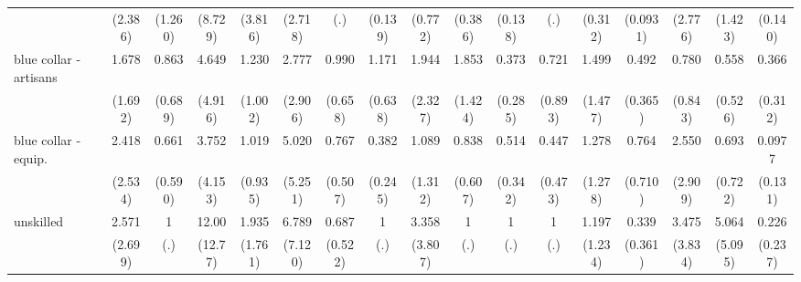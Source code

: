 {\begin{tabular}{l*{16}{c}}
                    &     (2.386)         &     (1.260)         &     (8.729)         &     (3.816)         &     (2.718)         &         (.)         &     (0.139)         &     (0.772)         &     (0.386)         &     (0.138)         &         (.)         &     (0.312)         &    (0.0931)         &     (2.776)         &     (1.423)         &     (0.140)         \\
[1em]
blue collar - artisans&       1.678         &       0.863         &       4.649         &       1.230         &       2.777         &       0.990         &       1.171         &       1.944         &       1.853         &       0.373         &       0.721         &       1.499         &       0.492         &       0.780         &       0.558         &       0.366         \\
                    &     (1.692)         &     (0.689)         &     (4.916)         &     (1.002)         &     (2.906)         &     (0.658)         &     (0.638)         &     (2.327)         &     (1.424)         &     (0.285)         &     (0.893)         &     (1.477)         &     (0.365)         &     (0.843)         &     (0.526)         &     (0.312)         \\
[1em]
blue collar - equip.&       2.418         &       0.661         &       3.752         &       1.019         &       5.020         &       0.767         &       0.382         &       1.089         &       0.838         &       0.514         &       0.447         &       1.278         &       0.764         &       2.550         &       0.693         &      0.0977         \\
                    &     (2.534)         &     (0.590)         &     (4.153)         &     (0.935)         &     (5.251)         &     (0.507)         &     (0.245)         &     (1.312)         &     (0.607)         &     (0.342)         &     (0.473)         &     (1.278)         &     (0.710)         &     (2.909)         &     (0.722)         &     (0.131)         \\
[1em]
unskilled           &       2.571         &           1         &       12.00\sym{*}  &       1.935         &       6.789         &       0.687         &           1         &       3.358         &           1         &           1         &           1         &       1.197         &       0.339         &       3.475         &       5.064         &       0.226         \\
                    &     (2.699)         &         (.)         &     (12.77)         &     (1.761)         &     (7.120)         &     (0.522)         &         (.)         &     (3.807)         &         (.)         &         (.)         &         (.)         &     (1.234)         &     (0.361)         &     (3.834)         &     (5.095)         &     (0.237)         \\

\end{tabular}}
